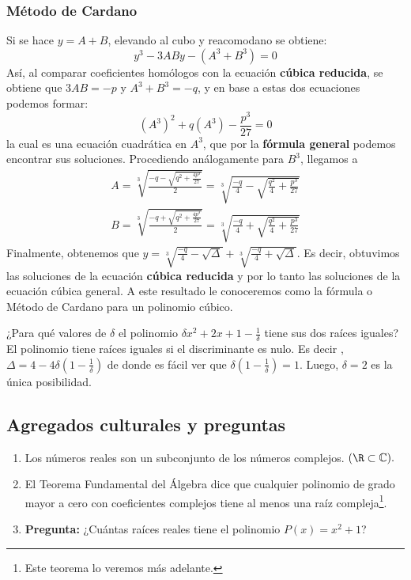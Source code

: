 {    \subsubsection{Método de Cardano}
    {
        Si se hace $y = A + B$, elevando al cubo y reacomodano se obtiene: \[y^3 -3ABy - (A^3 + B^3) = 0\]
        Así, al comparar coeficientes homólogos con la ecuación \textbf{cúbica reducida}, se obtiene que $3AB = - p$ y $A^3 + B^3 = -q$, y en base a estas dos ecuaciones podemos formar:
        \[(A^3)^2 + q(A^3) - \frac{p^3}{27} = 0\] la cual es una ecuación cuadrática en $A^3$, que por la \textbf{fórmula general} podemos encontrar sus soluciones. Procediendo análogamente para $B^3$, llegamos a
        \begin{gather*}
            A = \sqrt[3]{\frac{-q - \sqrt{q^2 + \frac{4p^3}{27}}}{2}} = \sqrt[3]{\frac{-q}{4} - \sqrt{\frac{q^2}{4} + \frac{p^3}{27}}}\\
            B = \sqrt[3]{\frac{-q + \sqrt{q^2 + \frac{4p^3}{27}}}{2}} = \sqrt[3]{\frac{-q}{4} + \sqrt{\frac{q^2}{4} + \frac{p^3}{27}}}
        \end{gather*}
        Finalmente, obtenemos que $y = \sqrt[3]{\frac{-q}{4} - \sqrt{\Delta}} + \sqrt[3]{\frac{-q}{4} + \sqrt{\Delta}}$. Es decir, obtuvimos las soluciones de la ecuación \textbf{cúbica reducida} y por lo tanto las soluciones de la ecuación cúbica general.
        A este resultado le conoceremos como la fórmula o Método de Cardano para un polinomio cúbico.
    }

    \begin{example}
        ¿Para qué valores de $\delta$ el polinomio $\delta x^2 + 2x + 1 - \frac{1}{\delta}$ tiene sus dos raíces iguales?
        \exampleProof
        {
            El polinomio tiene raíces iguales si el discriminante es nulo. Es decir , $\Delta = 4 - 4\delta (1 - \frac{1}{\delta})$ de donde es fácil ver que $\delta (1 - \frac{1}{\delta}) = 1.$ Luego, $\delta = 2$ es la única posibilidad.
        }
    \end{example}
}
\label{subsec:determinar-raices}

\subsection{Agregados culturales y preguntas}
{
    \begin{enumerate}
        \item Los números reales son un subconjunto de los números complejos. $(\R \subset \mathbb{C}).$
        \item El Teorema Fundamental del Álgebra dice que cualquier polinomio de grado mayor a cero con coeficientes complejos tiene al menos una raíz compleja\footnote{Este teorema lo veremos más adelante.}.
        \item \textbf{Pregunta:} ¿Cuántas raíces reales tiene el polinomio $P(x) = x^2+1$?
    \end{enumerate}
}\label{subsec:agregados-culturales}

